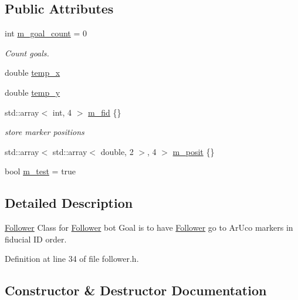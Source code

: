\subsection*{Public Attributes}
\begin{DoxyCompactItemize}
\item 
int \hyperlink{class_follower_af53c7dcd8b5a99111bdfe0c8dd2015cf}{m\+\_\+goal\+\_\+count} = 0
\begin{DoxyCompactList}\small\item\em Count goals. \end{DoxyCompactList}\item 
double \hyperlink{class_follower_ad27859970acb7f208f6b34e511673b26}{temp\+\_\+x}
\item 
double \hyperlink{class_follower_ac5ed416e67251cffb81b99a685341bff}{temp\+\_\+y}
\item 
std\+::array$<$ int, 4 $>$ \hyperlink{class_follower_a350054bbd7659d493cccc4b4ad9bc460}{m\+\_\+fid} \{\}
\begin{DoxyCompactList}\small\item\em store marker positions \end{DoxyCompactList}\item 
std\+::array$<$ std\+::array$<$ double, 2 $>$, 4 $>$ \hyperlink{class_follower_a6d4e1ebbe79cc8af601d53cba7aeb30a}{m\+\_\+posit} \{\}
\item 
bool \hyperlink{class_follower_a64e365d54197c51a8d1f777900b09647}{m\+\_\+test} = true
\end{DoxyCompactItemize}


\subsection{Detailed Description}
\hyperlink{class_follower}{Follower} Class for \hyperlink{class_follower}{Follower} bot Goal is to have \hyperlink{class_follower}{Follower} go to Ar\+Uco markers in fiducial ID order. 

Definition at line 34 of file follower.\+h.



\subsection{Constructor \& Destructor Documentation}
\mbox{\label{class_follower_a6870e654b7cc901944ead12870a6b107}} 
